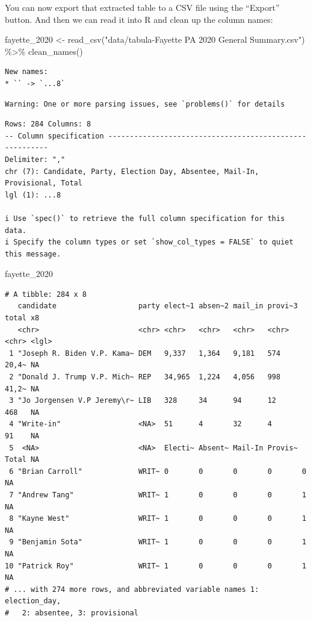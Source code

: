 \documentclass[
  letterpaper,
  DIV=11,
  numbers=noendperiod]{scrreprt}
\newenvironment{Shaded}{\begin{snugshade}}{\end{snugshade}}
\newcommand{\FunctionTok}[1]{\textcolor[rgb]{0.28,0.35,0.67}{#1}}
\newcommand{\NormalTok}[1]{\textcolor[rgb]{0.00,0.23,0.31}{#1}}
\newcommand{\OtherTok}[1]{\textcolor[rgb]{0.00,0.23,0.31}{#1}}
\newcommand{\SpecialCharTok}[1]{\textcolor[rgb]{0.37,0.37,0.37}{#1}}
\newcommand{\StringTok}[1]{\textcolor[rgb]{0.13,0.47,0.30}{#1}}
\begin{document}
You can now export that extracted table to a CSV file using the
``Export'' button. And then we can read it into R and clean up the
column names:

\begin{Shaded}
\begin{Highlighting}[]
\NormalTok{fayette\_2020 }\OtherTok{\textless{}{-}} \FunctionTok{read\_csv}\NormalTok{(}\StringTok{"data/tabula{-}Fayette PA 2020 General Summary.csv"}\NormalTok{) }\SpecialCharTok{\%\textgreater{}\%} \FunctionTok{clean\_names}\NormalTok{()}
\end{Highlighting}
\end{Shaded}

\begin{verbatim}
New names:
* `` -> `...8`
\end{verbatim}

\begin{verbatim}
Warning: One or more parsing issues, see `problems()` for details
\end{verbatim}

\begin{verbatim}
Rows: 284 Columns: 8
-- Column specification --------------------------------------------------------
Delimiter: ","
chr (7): Candidate, Party, Election Day, Absentee, Mail-In, Provisional, Total
lgl (1): ...8

i Use `spec()` to retrieve the full column specification for this data.
i Specify the column types or set `show_col_types = FALSE` to quiet this message.
\end{verbatim}

\begin{Shaded}
\begin{Highlighting}[]
\NormalTok{fayette\_2020}
\end{Highlighting}
\end{Shaded}

\begin{verbatim}
# A tibble: 284 x 8
   candidate                   party elect~1 absen~2 mail_in provi~3 total x8   
   <chr>                       <chr> <chr>   <chr>   <chr>   <chr>   <chr> <lgl>
 1 "Joseph R. Biden V.P. Kama~ DEM   9,337   1,364   9,181   574     20,4~ NA   
 2 "Donald J. Trump V.P. Mich~ REP   34,965  1,224   4,056   998     41,2~ NA   
 3 "Jo Jorgensen V.P Jeremy\r~ LIB   328     34      94      12      468   NA   
 4 "Write-in"                  <NA>  51      4       32      4       91    NA   
 5  <NA>                       <NA>  Electi~ Absent~ Mail-In Provis~ Total NA   
 6 "Brian Carroll"             WRIT~ 0       0       0       0       0     NA   
 7 "Andrew Tang"               WRIT~ 1       0       0       0       1     NA   
 8 "Kayne West"                WRIT~ 1       0       0       0       1     NA   
 9 "Benjamin Sota"             WRIT~ 1       0       0       0       1     NA   
10 "Patrick Roy"               WRIT~ 1       0       0       0       1     NA   
# ... with 274 more rows, and abbreviated variable names 1: election_day,
#   2: absentee, 3: provisional
\end{verbatim}
\end{document}

